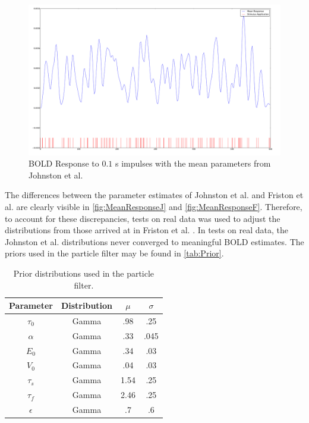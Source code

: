 \begin{figure}
\centering
\includegraphics[trim=6cm 2cm 6cm 2cm,width=15cm]{images/mean_response_johnston}
\caption{BOLD Response to $0.1$ s impulses with the mean parameters from 
Johnston et al. \cite{Johnston2007}}
\label{fig:MeanResponseJ}
\end{figure}

The differences between the parameter estimates of Johnston et al.
\cite{Johnston2007} and
Friston et al. \cite{Friston2002b} are clearly visible in 
\autoref{fig:MeanResponseJ} and \autoref{fig:MeanResponseF}.
Therefore, to account for these discrepancies, tests on
real data was used to adjust the distributions from those arrived at in
Friston et al. \cite{Friston2002b}. In tests on real data, the Johnston et al.
\cite{Johnston2007}
distributions never converged to meaningful \ac{BOLD} estimates.
The priors used in the particle filter may be found in \autoref{tab:Prior}.

\begin{table}[t]
\centering
\begin{tabular}{|c || c | c | c |}
\hline
Parameter & Distribution & $\mu$ & $\sigma$ \\
\hline
$\tau_0$ & Gamma & .98 & .25 \\
$\alpha$ & Gamma & .33 & .045\\
$E_0$    & Gamma & .34 & .03  \\
$V_0$    & Gamma & .04 & .03 \\
$\tau_s$ & Gamma & 1.54  & .25\\
$\tau_f$ & Gamma & 2.46  & .25\\
$\epsilon$ & Gamma & .7  & .6 \\
\hline
\end{tabular}
\caption{Prior distributions used in the particle filter.}
\label{tab:Prior}
\end{table}

